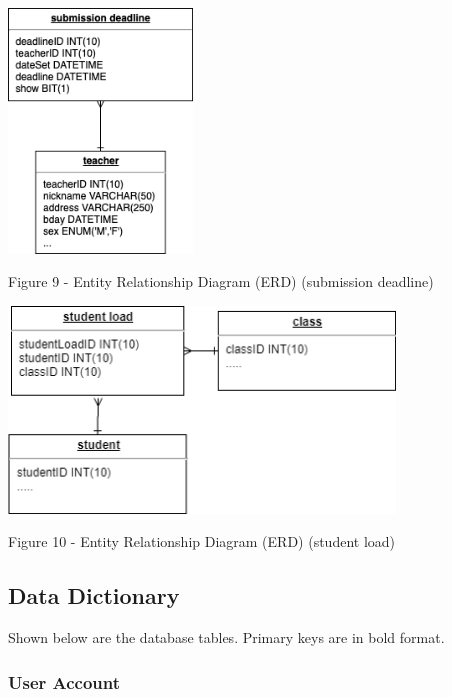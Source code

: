 \documentclass[11pt,a4paper,titlepage]{article}
\begin{document}
\vspace{1cm}
\begin{center}
    \includegraphics[height=6.5cm]{Submission-Deadline.png}
\end{center}
\vspace{1cm}
\begin{center}
    Figure 9 - Entity Relationship Diagram (ERD) (submission deadline)
\end{center}

\vspace{1cm}
\begin{center}
    \includegraphics[height=5.5cm]{Student-Load.png}
\end{center}
\vspace{1cm}
\begin{center}
    Figure 10 - Entity Relationship Diagram (ERD) (student load)
\end{center}


\newpage

\subsection{Data Dictionary}

Shown below are the database tables. Primary keys are in bold format.

\subsubsection{User Account}
\end{document}
